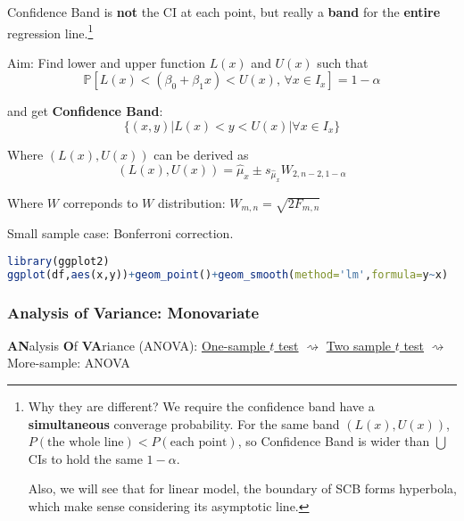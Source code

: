     Confidence Band is \textbf{not} the CI at each point, but really a \textbf{band} for the \textbf{entire} regression line.\footnote{Why they are different? We require the confidence band have a \textbf{simultaneous} converage probability. For the same band $ (L(x),U(x)) $, $ P(\text{the whole line})< P(\text{each point})$, so Confidence Band is wider than $ \bigcup $CIs to hold the same $ 1-\alpha $.
    
    Also, we will see that for linear model, the boundary of SCB forms hyperbola, which make sense considering its asymptotic line.}
    
    
    Aim: Find lower and upper function $ L(x) $ and $ U(x) $ such that
    \begin{equation}
        \mathbb{P}[L(x)<(\beta _0+\beta _1x)<U(x),\,\forall x\in I_x]=1-\alpha  
    \end{equation}
    
    and get \textbf{Confidence Band}:
    \begin{equation}
        \{(x,y)|L(x)<y<U(x)|\forall x\in I_x\} 
    \end{equation}
    

    Where $ (L(x),U(x)) $ can be derived as
    \begin{equation}
        (L(x),U(x))=\hat{\mu}_x\pm s_{\hat{\mu}_x}W_{2,n-2,1-\alpha}
    \end{equation}

    Where $ W $ correponds to $ W $ distribution: $ W_{m,n}=\sqrt{2F_{m,n}} $
    
    
    
    Small sample case: Bonferroni correction.
    
\begin{rcode}
\begin{lstlisting}[language=R]
library(ggplot2)
ggplot(df,aes(x,y))+geom_point()+geom_smooth(method='lm',formula=y~x)
\end{lstlisting}
\end{rcode}


\subsubsection{Analysis of Variance: Monovariate}
    \textbf{AN}alysis \textbf{O}f \textbf{VA}riance (ANOVA): \hyperlink{OneSampletTest}{One-sample $ t $ test} $\rightsquigarrow $ \hyperlink{TwoSampletTest}{Two sample $ t $ test} $\rightsquigarrow $ More-sample: ANOVA

